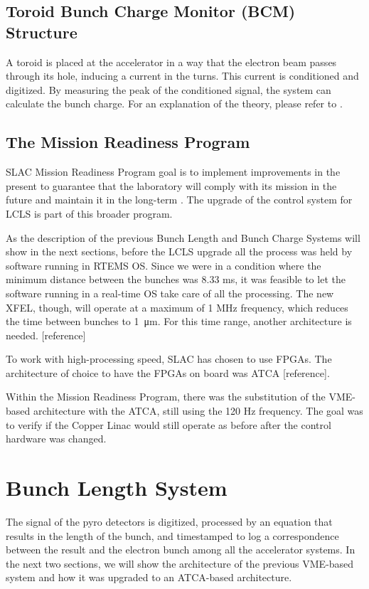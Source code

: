 \documentclass[letter,
        biblatex,   %
        keeplastbox,  %
        ]{jacow}
\begin{document}
\subsection{Toroid Bunch Charge Monitor (BCM) Structure}
A toroid is placed at the accelerator in a way that the electron beam passes through its hole, inducing a current in the turns. This current is conditioned and digitized. By measuring the peak of the conditioned signal, the system can calculate the bunch charge. For an explanation of the theory, please refer to \cite{slac-pub-398}.

\subsection{The Mission Readiness Program}
SLAC Mission Readiness Program goal is to implement improvements in the present to guarantee that the laboratory will comply with its mission in the future and maintain it in the long-term \cite{doe-MR}. The upgrade of the control system for LCLS is part of this broader program.

As the description of the previous Bunch Length and Bunch Charge Systems will show in the next sections, before the LCLS upgrade all the process was held by software running in RTEMS OS. Since we were in a condition where the minimum distance between the bunches was 8.33 ms, it was feasible to let the software running in a real-time OS take care of all the processing. The new XFEL, though, will operate at a maximum of 1 MHz frequency, which reduces the time between bunches to \SI{1}{\micro\meter}. For this time range, another architecture is needed. [reference]

To work with high-processing speed, SLAC has chosen to use FPGAs. The architecture of choice to have the FPGAs on board was ATCA [reference].

Within the Mission Readiness Program, there was the substitution of the VME-based architecture with the ATCA, still using the 120 Hz frequency. The goal was to verify if the Copper Linac would still operate as before after the control hardware was changed.

\section{Bunch Length System}
The signal of the pyro detectors is digitized, processed by an equation that results in the length of the bunch, and timestamped to log a correspondence between the result and the electron bunch among all the accelerator systems. In the next two sections, we will show the architecture of the previous VME-based system and how it was upgraded to an ATCA-based architecture.
\end{document}

